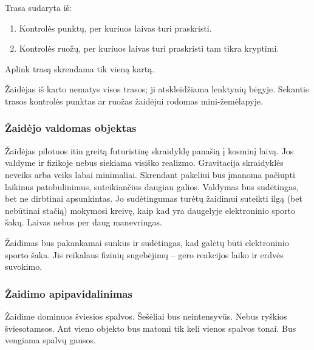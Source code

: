 Trasa sudaryta iš:
\begin{enumerate}
\item Kontrolės punktų, per kuriuos laivas turi praskristi.
\item Kontrolės ruožų, per kuriuos laivas turi praskristi tam tikra kryptimi.
\end{enumerate}
Aplink trasą skrendama tik vieną kartą.

Žaidėjas iš karto nematys visos trasos; ji atskleidžiama lenktynių bėgyje.
Sekantis trasos kontrolės punktas ar ruožas žaidėjui rodomas mini-žemėlapyje.

\subsubsection{Žaidėjo valdomas objektas}

Žaidėjas pilotuos itin greitą futuristinę skraidyklę panašią į kosminį laivą.
Jos valdyme ir fizikoje nebus siekiama visiško realizmo. Gravitacija skraidyklės neveiks
arba veiks labai minimaliai. Skrendant pakeliui bus įmanoma pačiupti laikinus patobulinimus,
suteikiančius daugiau galios.
Valdymas bus sudėtingas, bet ne dirbtinai apsunkintas.
Jo sudėtingumas turėtų žaidimui suteikti ilgą (bet nebūtinai stačią) mokymosi kreivę, kaip kad yra daugelyje elektroninio sporto šakų.
Laivas nebus per daug manevringas.

Žaidimas bus pakankamai sunkus ir sudėtingas, kad galėtų būti elektroninio sporto šaka.
Jis reikalaus fizinių sugebėjimų -- gero reakcijos laiko ir erdvės suvokimo.

\subsubsection{Žaidimo apipavidalinimas}

Žaidime dominuos šviesios spalvos.
Šešėliai bus neintensyvūs.
Nebus ryškios šviesotamsos.
Ant vieno objekto bus matomi tik keli vienos spalvos tonai.
Bus vengiama spalvų gausos.
